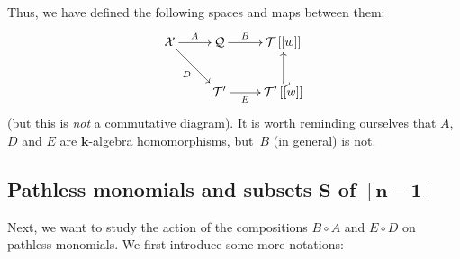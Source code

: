 \documentclass[11pt]{article}
\makeatletter
\numberwithin{equation}{section}
\newcommand{\calX}{\mathcal{X}}
\newcommand{\calQ}{\mathcal{Q}}
\newcommand{\calT}{\mathcal{T}}
\newcommand{\arinj}{\ar@{_{(}->}}
\makeatother
\begin{document}
Thus, we have defined the following spaces and maps between them:
\begin{gather*}
\xymatrix{
\calX\ar[r]^{A} \ar[dr]_{D} & \calQ\ar[r]^-{B} & \calT\left[\left
[w\right]\right] \\
& \calT^\prime\ar[r]_-{E} & \calT^\prime\left[\left[w\right]\right] \arinj[u]
}
\end{gather*}
(but this is \textit{not} a commutative diagram). It is worth reminding ourselves that $A$, $D$ and $E$ are $\mathbf{k}$-algebra homomorphisms, but~$B$ (in general) is not.

\subsection[Pathless monomials and subsets $S$ of $\protect{[n-1]}$]{Pathless monomials and subsets $\boldsymbol{S}$ of $\boldsymbol{[n-1]}$}

Next, we want to study the action of the compositions $B\circ A$ and $E\circ D$ on pathless monomials. We first introduce some more notations:
\end{document}
